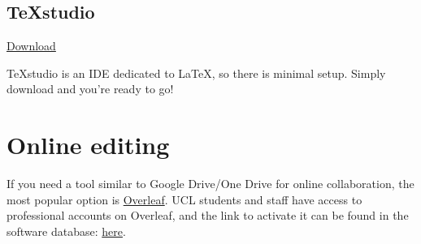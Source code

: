 \subsection{TeXstudio}
\href{https://www.texstudio.org/}{Download}

TeXstudio is an IDE dedicated to \LaTeX{}, so there is minimal setup. Simply download and you're ready to go!

\section{Online editing}
If you need a tool similar to Google Drive/One Drive for online collaboration, the most popular option is \href{https://www.overleaf.com/}{Overleaf}.
UCL students and staff have access to professional accounts on Overleaf, and the link to activate it can be found in the software database: \href{https://swdb.ucl.ac.uk/package/view/id/1235}{here}.